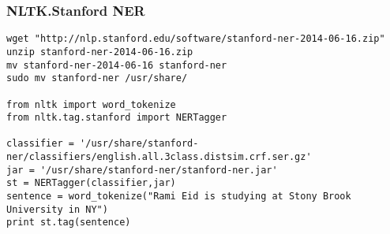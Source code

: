
\begin{frame}[fragile]\frametitle{NLTK.Stanford NER}
  \begin{lstlisting}
wget "http://nlp.stanford.edu/software/stanford-ner-2014-06-16.zip"
unzip stanford-ner-2014-06-16.zip
mv stanford-ner-2014-06-16 stanford-ner
sudo mv stanford-ner /usr/share/

from nltk import word_tokenize
from nltk.tag.stanford import NERTagger
 
classifier = '/usr/share/stanford-ner/classifiers/english.all.3class.distsim.crf.ser.gz'
jar = '/usr/share/stanford-ner/stanford-ner.jar'
st = NERTagger(classifier,jar)
sentence = word_tokenize("Rami Eid is studying at Stony Brook University in NY")
print st.tag(sentence)
  \end{lstlisting}
\end{frame}